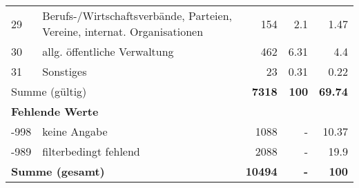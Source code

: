 \begin{longtable}{lXrrr}
        29 & \multicolumn{1}{X}{Berufs-/Wirtschaftsverbände, Parteien, Vereine, internat. Organisationen} & %
          \num{154} &
          \num[round-mode=places,round-precision=2]{2,1} &
          \num[round-mode=places,round-precision=2]{1,47} \\

        30 & \multicolumn{1}{X}{allg. öffentliche Verwaltung} & %
          \num{462} &
          \num[round-mode=places,round-precision=2]{6,31} &
          \num[round-mode=places,round-precision=2]{4,4} \\

        31 & \multicolumn{1}{X}{Sonstiges} & %
          \num{23} &
          \num[round-mode=places,round-precision=2]{0,31} &
          \num[round-mode=places,round-precision=2]{0,22} \\

     \midrule
     \multicolumn{2}{l}{Summe (gültig)} &
       \textbf{\num{7318}} &
     \textbf{100} &
       \textbf{\num[round-mode=places,round-precision=2]{69,74}} \\
     \multicolumn{5}{l}{\textbf{Fehlende Werte}}\\
       -998 &
       keine Angabe &
         \num{1088} &
        - &
         \num[round-mode=places,round-precision=2]{10,37} \\
       -989 &
       filterbedingt fehlend &
         \num{2088} &
        - &
         \num[round-mode=places,round-precision=2]{19,9} \\
     \midrule
     \multicolumn{2}{l}{\textbf{Summe (gesamt)}} &
          \textbf{\num{10494}} &
        \textbf{-} &
        \textbf{100} \\
     \bottomrule
     \end{longtable}
     
